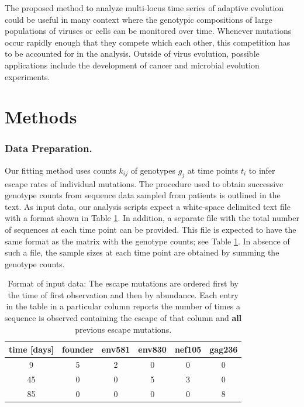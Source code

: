 \documentclass{frontiers}
\newcommand{\gt}{g}
\begin{document}
The proposed method to analyze multi-locus time series of adaptive
evolution could be useful in many context where the genotypic
compositions of large populations of viruses or cells can be
monitored over time. Whenever mutations occur rapidly enough that they
compete which each other, this competition has to be accounted for in the
analysis. Outside of virus evolution, possible applications include
the development of cancer and microbial evolution experiments. 


\section{Methods}

\subsubsection{Data Preparation.} 
Our fitting method uses counts $k_{ij}$ of genotypes $\gt_j$ at time
points $t_i$ to infer escape rates of individual mutations. The
procedure used to obtain successive genotype counts from sequence data
sampled from patients is outlined in the text. As input data, our
analysis scripts expect a white-space delimited text file with a format
shown in Table \ref{tab:data_example}. In addition, a separate file with
the total number of sequences at each time point can be provided. This
file is expected to have the same format as the matrix with the genotype
counts; see Table \ref{tab:data_example}. In absence of such a file, the
sample sizes at each time point are obtained by summing the genotype
counts.

\begin{table}
  \centering
  \begin{tabular}{|c|c|c|c|c|c|}
\hline
 time [days] & founder & 	env581 &	env830&	nef105&	gag236 \\ \hline
9	&5	&2	&0	&0	&0\\
45	&0	&0	&5	&3	&0\\
85	&0	&0	&0	&0	&8\\ \hline
  \end{tabular}
  \caption{Format of input data: The escape mutations are ordered
    first by the time of first observation and then by abundance. Each entry in the table
    in a particular column reports the number of times a sequence is
    observed containing the escape of that column and {\bf all}
    previous escape mutations. }
\label{tab:data_example}
\end{table}
\end{document}
